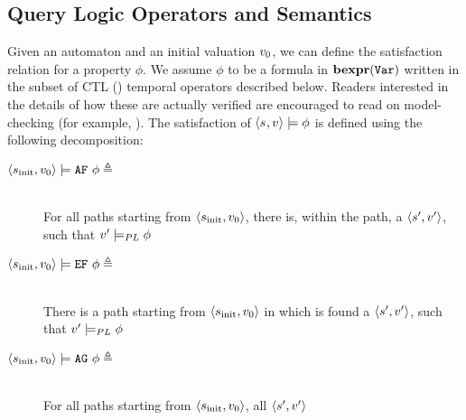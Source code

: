 \subsection{Query Logic Operators and Semantics}
\label{sec:automata_query_logic}
Given an automaton \automatasystem{} and an initial valuation
$v_{0}$, we can define the satisfaction relation for a
property $\phi$. We assume $\phi$ to be a formula in
$\textbf{bexpr}(\text{\texttt{Var}}{})$
written in the subset of CTL
(\cite{10.1145/567067.567080}) temporal operators described below. Readers
interested in the details of how these are actually verified are encouraged to
read on model-checking (for example, \cite{clarke}).
The satisfaction of
$\langle s_{}, v_{} \rangle \models \phi$ is
defined using the following decomposition:
\iffalse
\begin{description}
\item[%
   $
      \langle
         s_{\text{init}}{},
         v_{0}
      \rangle{}
      \models
      \text{\texttt{AF}}{}{}~\phi \triangleq
   $]~~\\
      For all paths starting from
         $\langle
            s_{\text{init}}{},
            v_{0}
         \rangle$,
         there is, within the path, a
         $\langle
            s_{}',
            v_{}'
         \rangle$,
         such that
         $
         v_{}'
         \models_{PL} \phi
         $
\item[%
   $
      \langle
         s_{\text{init}}{},
         v_{0}
      \rangle{}
      \models
      \text{\texttt{EF}}{}{}~\phi \triangleq
   $]~~\\
      There is a path starting from
         $\langle
            s_{\text{init}}{},
            v_{0}
         \rangle$ in which is found a
         $\langle
            s_{}',
            v_{}'
         \rangle$,
         such that
         $
         v_{}'
         \models_{PL} \phi
         $
\item[%
   $
      \langle
         s_{\text{init}}{},
         v_{0}
      \rangle{}
      \models
      \text{\texttt{AG}}{}{}~\phi \triangleq
   $]~~\\
      For all paths starting from
         $\langle
            s_{\text{init}}{},
            v_{0}
         \rangle$,
         all
         $\langle
            s_{}',
            v_{}'
         \rangle$

\end{description}
